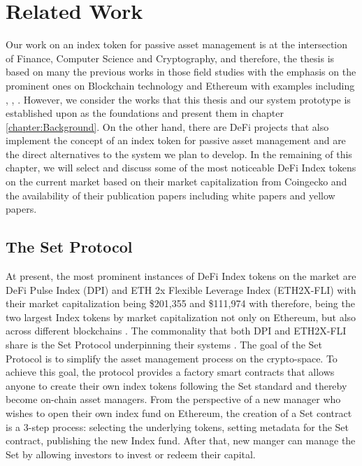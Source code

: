 \chapter{Related Work}\label{chap:RelatedWork}

Our work on an index token for passive asset management is at the intersection of Finance, Computer Science and Cryptography, and therefore, the thesis is based on many the previous works in those field studies with the emphasis on the prominent ones on Blockchain technology and Ethereum with examples including \cite{satoshi2008peer}, \cite{wood2014ethereum}, \cite{buterin2014next}. However, we consider the works that this thesis and our system prototype is established upon as the foundations and present them in chapter \ref{chapter:Background}. On the other hand, there are DeFi projects that also implement the concept of an index token for passive asset management and are the direct alternatives to the system we plan to develop. In the remaining of this chapter, we will select and discuss some of the most noticeable DeFi Index tokens on the current market based on their market capitalization from Coingecko \cite{geckoDefiIndexByCap} and the availability of their publication papers including white papers and yellow papers.


\section{The Set Protocol}

At present, the most prominent instances of DeFi Index tokens on the market are DeFi Pulse Index (DPI) and ETH 2x Flexible Leverage Index (ETH2X-FLI) with their market capitalization being \$201,355 and \$111,974 with therefore, being the two largest Index tokens by market capitalization not only on Ethereum, but also across different blockchains \cite{geckoDefiIndexByCap}. The commonality that both DPI and ETH2X-FLI share is the Set Protocol underpinning their systems \cite{tokensetsExplore}. The goal of the Set Protocol \cite{setprotocolwhitepaper} is to simplify the asset management process on the crypto-space. To achieve this goal, the protocol provides a factory smart contracts that allows anyone to create their own index tokens following the Set standard and thereby become on-chain asset managers. From the perspective of a new manager who wishes to open their own index fund on Ethereum, the creation of a Set contract is a 3-step process: selecting the underlying tokens, setting metadata for the Set contract, publishing the new Index fund. After that, new manger can manage the Set by allowing investors to invest or redeem their capital. 


